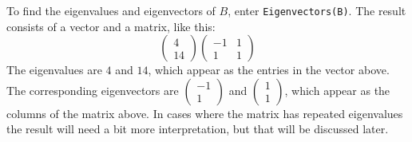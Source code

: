 \documentclass{amsart}
\begin{document}
To find the eigenvalues and eigenvectors of $B$, enter
\verb|Eigenvectors(B)|.  The result consists of a vector and a matrix,
like this:
\[ \begin{pmatrix} 4\\ 14\end{pmatrix}
   \begin{pmatrix} -1&1 \\ 1&1 \end{pmatrix}
\]
The eigenvalues are $4$ and $14$, which appear as the entries in the
vector above.  The corresponding eigenvectors are
$\begin{pmatrix}-1\\1\end{pmatrix}$ and
$\begin{pmatrix}1\\1\end{pmatrix}$, which appear as the columns of the
matrix above.  In cases where the matrix has repeated eigenvalues the
result will need a bit more interpretation, but that will be discussed
later.
\end{document}
